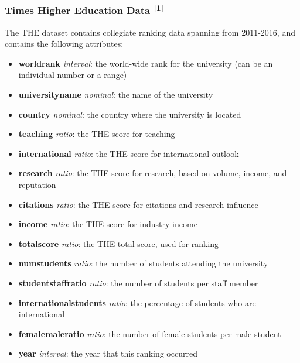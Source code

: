 \documentclass[12pt]{article}
\begin{document}
\subsubsection{Times Higher Education Data \textsuperscript{[1]}}
The THE dataset contains collegiate ranking data spanning from 2011-2016, and contains the following attributes:
\begin{itemize}
\item \textbf{world\textunderscore rank} \textit{interval}: the world-wide rank for the university (can be an individual number or a range)
\item \textbf{university\textunderscore name} \textit{nominal}: the name of the university
\item \textbf{country} \textit{nominal}: the country where the university is located
\item \textbf{teaching} \textit{ratio}: the THE score for teaching
\item \textbf{international} \textit{ratio}: the THE score for international outlook
\item \textbf{research} \textit{ratio}: the THE score for research, based on volume, income, and reputation
\item \textbf{citations} \textit{ratio}: the THE score for citations and research influence
\item \textbf{income} \textit{ratio}: the THE score for industry income
\item \textbf{total\textunderscore score} \textit{ratio}: the THE total score, used for ranking
\item \textbf{num\textunderscore students} \textit{ratio}: the number of students attending the university
\item \textbf{student\textunderscore staff\textunderscore ratio} \textit{ratio}: the number of students per staff member
\item \textbf{international\textunderscore students} \textit{ratio}: the percentage of students who are international
\item \textbf{female\textunderscore male\textunderscore ratio} \textit{ratio}: the number of female students per male student
\item \textbf{year} \textit{interval}: the year that this ranking occurred
\end{itemize}
\end{document}

